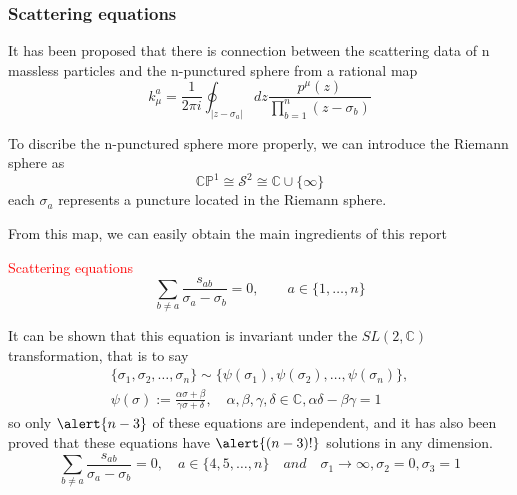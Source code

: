 \documentclass{beamer}
\begin{document}
\begin{frame}
    \frametitle{Scattering equations}
    It has been proposed that there is connection between the scattering data of n massless particles and the n-punctured sphere from a rational map
    \begin{equation*}
        k_\mu^a=\frac{1}{2\pi i}\oint_{|z-\sigma_a|}dz\frac{p^\mu(z)}{\prod ^n_{b=1}(z-\sigma_b)}
    \end{equation*}
 
    To discribe the n-punctured sphere more properly, we can introduce the Riemann sphere as
    \begin{equation*}
        \mathbb{CP}^1\cong \mathcal{S}^2\cong \mathbb{C}\cup\{\infty\}
    \end{equation*}
    each $\sigma_a$ represents a puncture located in the Riemann sphere.
   
\end{frame}

\begin{frame}
    From this map, we can easily obtain the main ingredients of this report \\
    

    \begin{block}{\textcolor{red}{Scattering equations}}
        \begin{equation*}
            \sum_{b\neq a } \frac{s_{ab}}{\sigma_a-\sigma_{b}}=0,\qquad a\in \{1,\dots,n\}
        \end{equation*}
    \end{block}
    It can be shown that this equation is invariant under the $SL(2,\mathbb{C})$ transformation, that is to say
    \begin{align*}
        \{\sigma_1,\sigma_2,\ldots,\sigma_n\}\sim\{\psi(\sigma_1),\psi(\sigma_2),\ldots,\psi(\sigma_n)\},\\\psi(\sigma):=\frac{\alpha\sigma+\beta}{\gamma\sigma+\delta},\quad\alpha,\beta,\gamma,\delta\in\mathbb{C},\alpha\delta-\beta\gamma=1
    \end{align*}
    so only $\alert{n-3}$ of these equations are independent, and it has also been proved that these equations have $\alert{(n-3)!}$ solutions in any dimension. 
    \begin{equation*}
        \sum_{b\neq a } \frac{s_{ab}}{\sigma_a-\sigma_{b}}=0,\quad a\in \{4,5,\dots,n\}\quad and\quad  \sigma_1\rightarrow\infty,\sigma_2=0,\sigma_3=1
    \end{equation*}
\end{frame}
\iffalse
\end{document}
